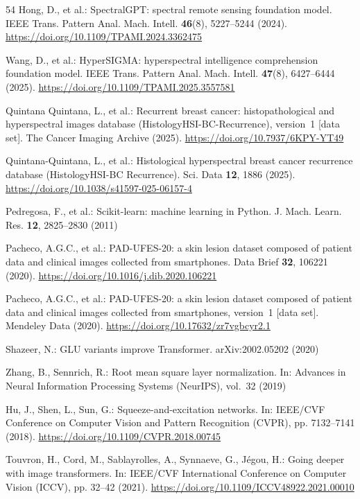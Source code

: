 \documentclass{svproc}
\begin{document}
\begin{thebibliography}{54}
Hong, D., et al.: SpectralGPT: spectral remote sensing foundation model. IEEE Trans. Pattern Anal. Mach. Intell. \textbf{46}(8), 5227--5244 (2024). \url{https://doi.org/10.1109/TPAMI.2024.3362475}

Wang, D., et al.: HyperSIGMA: hyperspectral intelligence comprehension foundation model. IEEE Trans. Pattern Anal. Mach. Intell. \textbf{47}(8), 6427--6444 (2025). \url{https://doi.org/10.1109/TPAMI.2025.3557581}

Quintana Quintana, L., et al.: Recurrent breast cancer: histopathological and hyperspectral images database (HistologyHSI-BC-Recurrence), version~1 [data set]. The Cancer Imaging Archive (2025). \url{https://doi.org/10.7937/6KPY-YT49}

Quintana-Quintana, L., et al.: Histological hyperspectral breast cancer recurrence database (HistologyHSI-BC Recurrence). Sci. Data \textbf{12}, 1886 (2025). \url{https://doi.org/10.1038/s41597-025-06157-4}

Pedregosa, F., et al.: Scikit-learn: machine learning in Python. J. Mach. Learn. Res. \textbf{12}, 2825--2830 (2011)

Pacheco, A.G.C., et al.: PAD-UFES-20: a skin lesion dataset composed of patient data and clinical images collected from smartphones. Data Brief \textbf{32}, 106221 (2020). \url{https://doi.org/10.1016/j.dib.2020.106221}

Pacheco, A.G.C., et al.: PAD-UFES-20: a skin lesion dataset composed of patient data and clinical images collected from smartphones, version~1 [data set]. Mendeley Data (2020). \url{https://doi.org/10.17632/zr7vgbcyr2.1}

Shazeer, N.: GLU variants improve Transformer. arXiv:2002.05202 (2020)

Zhang, B., Sennrich, R.: Root mean square layer normalization. In: Advances in Neural Information Processing Systems (NeurIPS), vol.~32 (2019)

Hu, J., Shen, L., Sun, G.: Squeeze-and-excitation networks. In: IEEE/CVF Conference on Computer Vision and Pattern Recognition (CVPR), pp. 7132--7141 (2018). \url{https://doi.org/10.1109/CVPR.2018.00745}

Touvron, H., Cord, M., Sablayrolles, A., Synnaeve, G., J\'{e}gou, H.: Going deeper with image transformers. In: IEEE/CVF International Conference on Computer Vision (ICCV), pp. 32--42 (2021). \url{https://doi.org/10.1109/ICCV48922.2021.00010}


\end{thebibliography}
\end{document}
